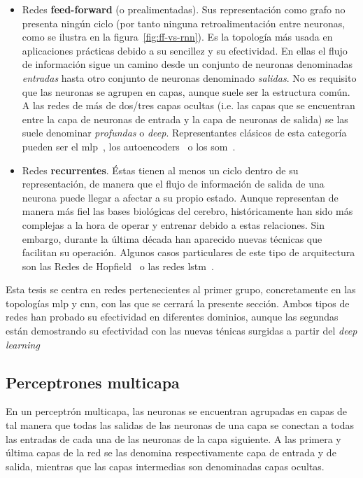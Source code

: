 \begin{itemize}
	\item Redes \textbf{feed-forward} (o prealimentadas). Sus representación como grafo no presenta ningún ciclo (por tanto ninguna retroalimentación entre neuronas, como se ilustra en la figura~\ref{fig:ff-vs-rnn}). Es la topología más usada en aplicaciones prácticas debido a su sencillez y su efectividad. En ellas el flujo de información sigue un camino desde un conjunto de neuronas denominadas \textit{entradas} hasta otro conjunto de neuronas denominado \textit{salidas}. No es requisito que las neuronas se agrupen en capas, aunque suele ser la estructura común. A las redes de más de dos/tres capas ocultas (i.e. las capas que se encuentran entre la capa de neuronas de entrada y la capa de neuronas de salida) se las suele denominar \textit{profundas} o \textit{deep}. Representantes clásicos de esta categoría pueden ser el \gls{mlp}~\cite{rumelhart1985learning}, los autoencoders~\cite{Hinton2006} o los \gls{som}~\cite{kohonen1998self}.
	\item Redes \textbf{recurrentes}. Éstas tienen al menos un ciclo dentro de su representación, de manera que el flujo de información de salida de una neurona puede llegar a afectar a su propio estado. Aunque representan de manera más fiel las bases biológicas del cerebro, históricamente han sido más complejas a la hora de operar y entrenar debido a estas relaciones. Sin embargo, durante la última década han aparecido nuevas técnicas que facilitan su operación. Algunos casos particulares de este tipo de arquitectura son las Redes de Hopfield~\cite{hopfield1982neural} o las redes \gls{lstm}~\cite{hochreiter1997long}.
\end{itemize}

Esta tesis se centra en redes pertenecientes al primer grupo, concretamente en las topologías \gls{mlp} y \gls{cnn}, con las que se cerrará la presente sección. Ambos tipos de redes han probado su efectividad en diferentes dominios, aunque las segundas están demostrando su efectividad con las nuevas ténicas surgidas a partir del \textit{deep learning}

\subsection{Perceptrones multicapa}

En un perceptrón multicapa, las neuronas se encuentran agrupadas en capas de tal manera que todas las salidas de las neuronas de una capa se conectan a todas las entradas de cada una de las neuronas de la capa siguiente. A las primera y última capas de la red se las denomina respectivamente capa de entrada y de salida, mientras que las capas intermedias son denominadas capas ocultas.

